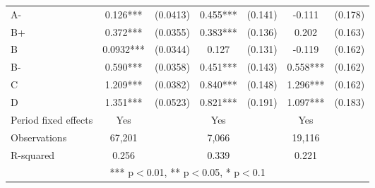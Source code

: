 \documentclass[12pt]{article}
\begin{document}
\begin{table}[H]
{\begin{tabular}{lcccccc}
    A- & 0.126*** & (0.0413) & 0.455*** & (0.141) & -0.111 & (0.178) \\
    B+ & 0.372*** & (0.0355) & 0.383*** & (0.136) & 0.202 & (0.163) \\
    B & 0.0932*** & (0.0344) & 0.127 & (0.131) & -0.119 & (0.162) \\
    B- & 0.590*** & (0.0358) & 0.451*** & (0.143) & 0.558*** & (0.162) \\
    C & 1.209*** & (0.0382) & 0.840*** & (0.148) & 1.296*** & (0.162) \\
    D & 1.351*** & (0.0523) & 0.821*** & (0.191) & 1.097*** & (0.183) \vspace{2mm} \\
    \midrule
    Period fixed effects & Yes & & Yes & & Yes & \\
    Observations & 67,201 & & 7,066 & & 19,116 & \\
    R-squared & 0.256 & & 0.339 & & 0.221 & \\
    \bottomrule
    \multicolumn{7}{c}{*** p$<$0.01, ** p$<$0.05, * p$<$0.1} \\
    \end{tabular}%
    }
\end{table}
\end{document}
